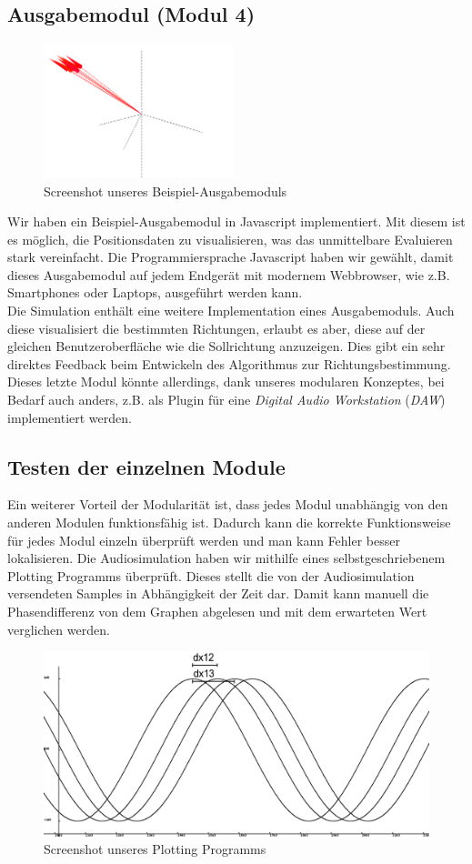\subsection{Ausgabemodul (Modul 4)}
\begin{figure}
	\centering
	\includegraphics[width=0.49\textwidth]{img/output}
	\caption{Screenshot unseres Beispiel-Ausgabemoduls}
	\label{fig:output}
\end{figure}
Wir haben ein Beispiel-Ausgabemodul in Javascript implementiert. Mit diesem ist es möglich, die Positionsdaten zu visualisieren, was das unmittelbare Evaluieren stark vereinfacht. Die Programmiersprache Javascript haben wir gewählt, damit dieses Ausgabemodul auf jedem Endgerät mit modernem Webbrowser, wie z.B. Smartphones oder Laptops, ausgeführt werden kann.\\
Die Simulation enthält eine weitere Implementation eines Ausgabemoduls. Auch diese visualisiert die bestimmten Richtungen, erlaubt es aber, diese auf der gleichen Benutzeroberfläche wie die Sollrichtung anzuzeigen. Dies gibt ein sehr direktes Feedback beim Entwickeln des Algorithmus zur Richtungsbestimmung. Dieses letzte Modul könnte allerdings, dank unseres modularen Konzeptes, bei Bedarf auch anders, z.B. als Plugin für eine \textit{Digital Audio Workstation} (\textit{DAW}) implementiert werden.
\subsection{Testen der einzelnen Module}
Ein weiterer Vorteil der Modularität ist, dass jedes Modul unabhängig von den anderen Modulen funktionsfähig ist. Dadurch kann die korrekte Funktionsweise für jedes Modul einzeln überprüft werden und man kann Fehler besser lokalisieren.
Die Audiosimulation haben wir mithilfe eines selbstgeschriebenem Plotting Programms überprüft. Dieses stellt die von der Audiosimulation versendeten Samples in Abhängigkeit der Zeit dar. Damit kann manuell die Phasendifferenz von dem Graphen abgelesen und mit dem erwarteten Wert verglichen werden.
\begin{figure} [H]
	\centering
  \includegraphics[width=.8\linewidth]{img/glplot}
  \caption{Screenshot unseres Plotting Programms}
  \label{fig:glplot}
\end{figure}

